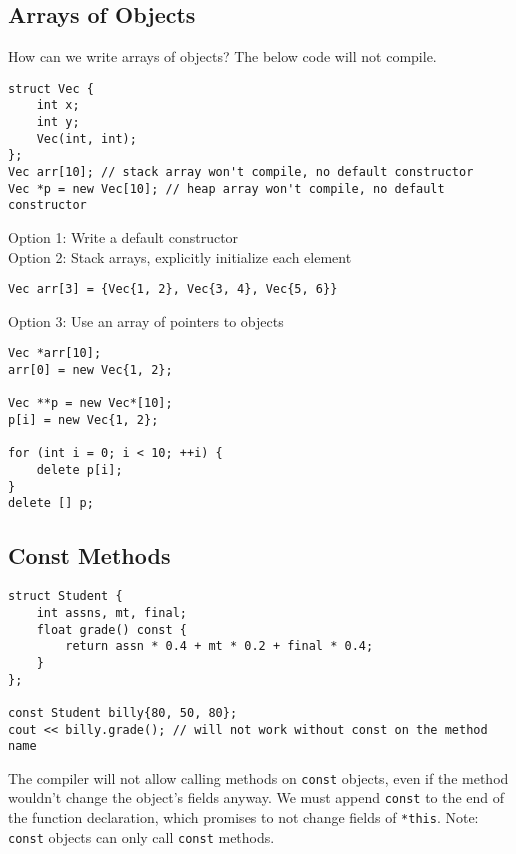 \documentclass[12pt]{article}
\begin{document}
\subsection{Arrays of Objects}
How can we write arrays of objects? The below code will not compile.
\begin{lstlisting}
struct Vec {
    int x;
    int y;
    Vec(int, int);
};
Vec arr[10]; // stack array won't compile, no default constructor
Vec *p = new Vec[10]; // heap array won't compile, no default constructor
\end{lstlisting}
Option 1: Write a default constructor\\
Option 2: Stack arrays, explicitly initialize each element
\begin{lstlisting}
Vec arr[3] = {Vec{1, 2}, Vec{3, 4}, Vec{5, 6}}
\end{lstlisting}
Option 3: Use an array of pointers to objects
\begin{lstlisting}
Vec *arr[10];
arr[0] = new Vec{1, 2};

Vec **p = new Vec*[10];
p[i] = new Vec{1, 2};

for (int i = 0; i < 10; ++i) {
    delete p[i];
}
delete [] p;
\end{lstlisting}
\newpage
\subsection{Const Methods}
\begin{lstlisting}
struct Student {
    int assns, mt, final;
    float grade() const {
        return assn * 0.4 + mt * 0.2 + final * 0.4;
    }
};

const Student billy{80, 50, 80};
cout << billy.grade(); // will not work without const on the method name
\end{lstlisting}
The compiler will not allow calling methods on \lstinline{const} objects, even if the method wouldn't change the object's fields anyway. We must append \lstinline{const} to the end of the function declaration, which promises to not change fields of \lstinline{*this}. Note: \lstinline{const} objects can only call \lstinline{const} methods.
\end{document}
